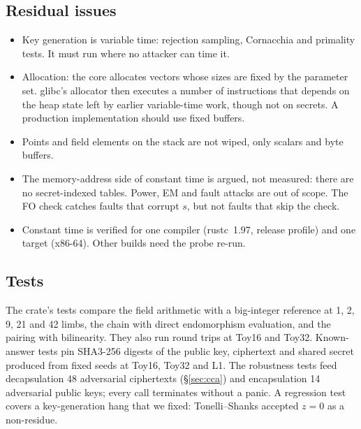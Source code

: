 \subsection{Residual issues}
\begin{itemize}
\item Key generation is variable time: rejection sampling, Cornacchia and
  primality tests. It must run where no attacker can time it.
\item Allocation: the core allocates vectors whose sizes are fixed by the
  parameter set. glibc's allocator then executes a number of instructions
  that depends on the heap state left by earlier variable-time work, though
  not on secrets. A production implementation should use fixed buffers.
\item Points and field elements on the stack are not wiped, only scalars and
  byte buffers.
\item The memory-address side of constant time is argued, not measured: there
  are no secret-indexed tables. Power, EM and fault attacks are out of scope.
  The FO check catches faults that corrupt $s$, but not faults that skip the
  check.
\item Constant time is verified for one compiler (rustc~1.97, release
  profile) and one target (x86-64). Other builds need the probe re-run.
\end{itemize}

\subsection{Tests}
The crate's tests compare the field arithmetic with a big-integer reference
at 1, 2, 9, 21 and 42 limbs, the chain with direct endomorphism evaluation,
and the pairing with bilinearity. They also run round trips at Toy16 and
Toy32. Known-answer tests pin SHA3-256 digests of the public key, ciphertext
and shared secret produced from fixed seeds at Toy16, Toy32 and L1. The
robustness tests feed decapsulation 48 adversarial ciphertexts
(\S\ref{sec:cca}) and encapsulation 14 adversarial public keys; every call
terminates without a panic. A
regression test covers a key-generation hang that we fixed: Tonelli--Shanks
accepted $z=0$ as a non-residue.

